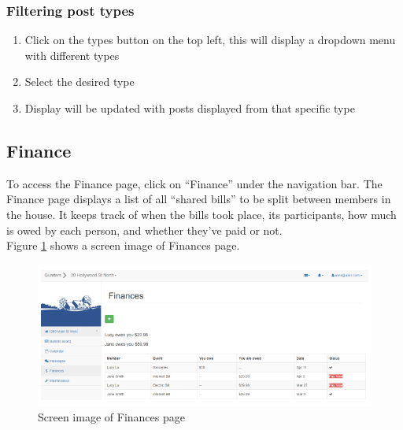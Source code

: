 \documentclass[12pt]{article}
\begin{document}
    \subsubsection{Filtering post types}
    \begin{enumerate}
        \item Click on the types button on the top left, this will display a dropdown menu with different types
        \item Select the desired type
        \item Display will be updated with posts displayed from that specific type
    \end{enumerate}


    \subsection{Finance}
    To access the Finance page, click on ``Finance'' under the navigation bar. The Finance page displays a list of all ``shared bills'' to be split between members in the house. It keeps track of when the bills took place, its participants, how much is owed by each person, and whether they've paid or not.\\
    Figure \ref{fig:finances} shows a screen image of Finances page.
    \begin{figure}
        \centering
        \includegraphics[width=\textwidth]{finances}
        \caption{Screen image of Finances page}
        \label{fig:finances}
    \end{figure}
\end{document}

